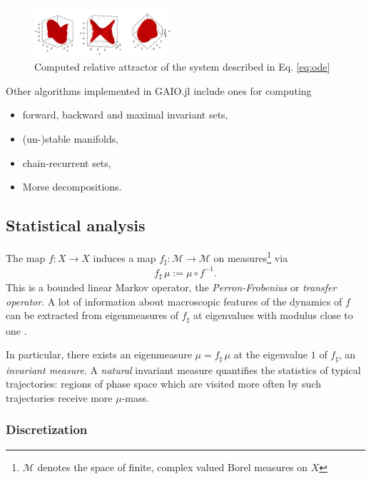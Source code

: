 \documentclass{juliacon}
\newcommand{\cM}{\mathcal{M}}
\begin{document}
\begin{figure}[h]
    \centering
    \includegraphics[width=0.45\textwidth]{attractor.png}
    \caption{Computed relative attractor of the system described in Eq. \ref{eq:ode}}
    \label{fig:attractor}
\end{figure}


Other algorithms implemented in GAIO.jl include ones for computing
\begin{itemize}[label=$\bullet$]
    \item forward, backward and maximal invariant sets,
    \item (un-)stable manifolds,
    \item chain-recurrent sets,
    \item Morse decompositions.
\end{itemize}

\subsection{Statistical analysis}
\label{sec:architecture}

The map $f:X \to X$ induces a map $f_\sharp : \cM \to \cM$ on measures\footnote{$\cM$ denotes the space of finite, complex valued Borel measures on $X$} via 
\begin{equation}
    f_\sharp\, \mu := \mu \circ f^{-1}.
\end{equation}
This is a bounded linear Markov operator, the \emph{Perron-Frobenius} or \emph{transfer operator}.  A lot of information about macroscopic features of the dynamics of $f$ can be extracted from eigenmeasures of $f_\sharp$ at eigenvalues with modulus close to one \cite{DeJu:99}.   

In particular, there exists \cite{invariantmeasureexistence} an eigenmeasure $\mu = f_\sharp\, \mu$ at the eigenvalue $1$ of $f_\sharp$, an \emph{invariant measure}. A \emph{natural} invariant measure \cite{} quantifies the statistics of typical trajectories: regions of phase space which are visited more often by such trajectories receive more $\mu$-mass.  

\subsubsection*{Discretization} 
\end{document}
